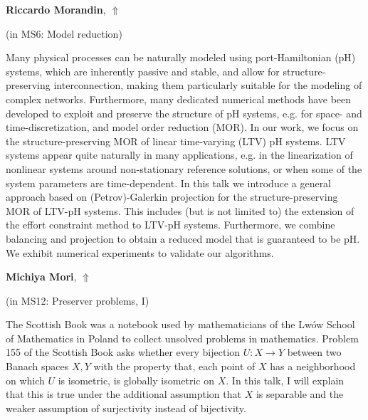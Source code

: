\documentclass[ILAS2025-program.tex]{subfiles}
\begin{document}
     \hypertarget{down0129}{}\begin{ilasabstract}
    
    \textbf{Riccardo Morandin},  \hfill \hyperlink{up0129}{$\Uparrow$}
    
    (in {\color{mstitle}MS6: Model reduction})
        
        \mtskip
    Many physical processes can be naturally modeled using port-Hamiltonian (pH) systems, which are inherently passive and stable, and allow for structure-preserving interconnection, making them particularly suitable for the modeling of complex networks. Furthermore, many dedicated numerical methods have been developed to exploit and preserve the structure of pH systems, e.g. for space- and time-discretization, and model order reduction (MOR).
In our work, we focus on the structure-preserving MOR of linear time-varying (LTV) pH systems. LTV systems appear quite naturally in many applications, e.g. in the linearization of nonlinear systems around non-stationary reference solutions, or when some of the system parameters are time-dependent.
In this talk we introduce a general approach based on (Petrov)-Galerkin projection for the structure-preserving MOR of LTV-pH systems. This includes (but is not limited to) the extension of the effort constraint method to LTV-pH systems. Furthermore, we combine balancing and projection to obtain a reduced model that is guaranteed to be pH. We exhibit numerical experiments to validate our algorithms.
\end{ilasabstract}
     \hypertarget{down0127}{}\begin{ilasabstract}
    
    \textbf{Michiya Mori},  \hfill \hyperlink{up0127}{$\Uparrow$}
    
    (in {\color{mstitle}MS12: Preserver problems, I})
        
        \mtskip
    The Scottish Book was a notebook used by mathematicians of the Lw\'ow School of Mathematics in Poland to collect unsolved problems in mathematics.
Problem 155 of the Scottish Book asks whether every bijection $U\colon X\to Y$ between two Banach spaces $X, Y$ with the property that, each point of $X$ has a neighborhood on which $U$ is isometric, is globally isometric on $X$. 
In this talk, I will explain that this is true under the additional assumption that $X$ is separable and the weaker assumption of surjectivity instead of bijectivity.
\end{ilasabstract}
\end{document}
